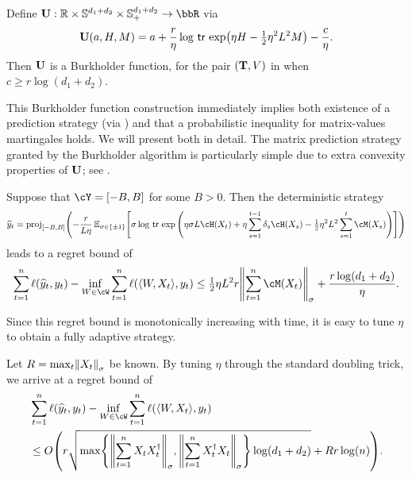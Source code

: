   \begin{theorem}
    \label{thm:matrix_burkholder}
    Define $\burk:\reals\times \sym^{d_1+d_2}\times \sym^{d_1+d_2}_{+}\to{}\bbR$ via
    \[
      \burk(a, H, M) = a+ \frac{r}{\eta}\log\,\Tr\,\exp\prn*{\eta{}H - {\textstyle\frac{1}{2}}\eta^{2}L^{2}M} - \frac{c}{\eta}.
    \]
    Then $\mathbf{U}$ is a Burkholder function, for the pair $(\mathbf{T}, V)$ in  when $c\geq{}r\log(d_1 + d_2)$.

  \end{theorem}
  This Burkholder function construction immediately implies both existence of a prediction strategy (via ) and that a probabilistic inequality for matrix-values martingales holds. We will present both in detail. The matrix prediction strategy granted by the Burkholder algorithm is particularly simple due to extra convexity properties of $\mathbf{U}$; see .
  
  \begin{corollary}
    \label{corr:matrix_strategy}
    Suppose that $\cY=\brk*{-B, B}$ for some $B>0$. Then the deterministic strategy
    \begin{equation}
      \label{eq:matrix_pred}      
      \pred_{t} = \mathrm{proj}_{\brk*{-B, B}}\prn*{-\frac{r}{L\eta}\En_{\sigma\in\pmo}\brk*{
        \sigma\log\,\Tr\,\exp\,\prn*{\eta\sigma{}L\cH(X_t) + \eta{}\sum_{s=1}^{t-1}\dl_{s}\cH(X_s) - {\textstyle\frac{1}{2}}\eta^{2}L^{2}\sum_{s=1}^{t}\cM(X_s)}
        }}
      \end{equation}
       leads to a regret bound of
      \[
        \sum_{t=1}^{n}\loss(\pred_t, y_t) - \inf_{W\in\cW}\sum_{t=1}^{n}\loss(\tri*{W,X_t}, y_t) \leq{}
        {\textstyle\frac{1}{2}}\eta{}L^2 r\nrm*{\sum_{t=1}^{n}\cM(X_t)}_{\sigma} + \frac{r\log(d_1 + d_2)}{\eta}.
      \]
  \end{corollary}

  Since this regret bound is monotonically increasing with time, it is easy to tune $\eta$ to obtain a fully adaptive strategy.
  \begin{proposition}
    Let $R=\max_{t}\nrm*{X_t}_{\sigma}$ be known. By tuning $\eta$ through the standard doubling trick, we arrive at a regret bound of  
    \begin{align*}
      &\sum_{t=1}^{n}\loss(\pred_t, y_t) - \inf_{W\in\cW}\sum_{t=1}^{n}\loss(\tri*{W,X_t}, y_t) 
    \\ &\leq{}
      O\prn*{r\sqrt{\max\crl*{\nrm*{\sum_{t=1}^{n}X_{t}X_{t}^{\trn}}_{\sigma}, \nrm*{\sum_{t=1}^{n}X_{t}^{\trn}X_{t}}_{\sigma}}\log(d_1+d_2)} + Rr\log(n)}.
    \end{align*}
  \end{proposition}
	
